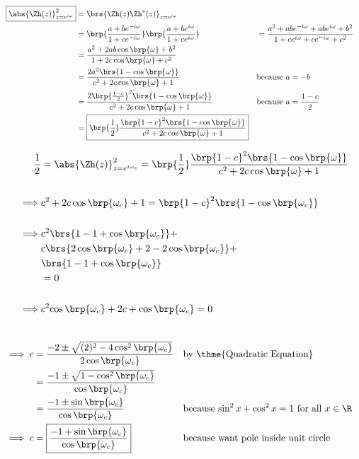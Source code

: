 %
\begin{align*}
  \boxed{\abs{\Zh(z)}^2_{z=e^{i\omega}}}
    &= \brs{\Zh(z)\Zh^\ast(z)}_{z=e^{i\omega}}
  \\&= \brp{\frac{a + be^{-i\omega}}{1 + ce^{-i\omega}}}
       \brp{\frac{a + be^{i\omega}}{1 + ce^{i\omega}}}
   &&= \frac{a^2 + abe^{-i\omega} + abe^{i\omega} + b^2}
            {1   +  ce^{i\omega} +  ce^{-i\omega} + c^2}
  \\&= \frac{a^2 + 2ab\cos\brp{\omega} + b^2}
            {1   + 2 c\cos\brp{\omega} + c^2}
  \\&= \frac{2a^2\brs{1 -  \cos\brp{\omega}}}
            {c^2 + 2 c\cos\brp{\omega} + 1}
    && \text{because $a=-b$}
  \\&= \frac{2\brp{\frac{1-c}{2}}^2\brs{1 -  \cos\brp{\omega}}}
            {c^2 + 2 c\cos\brp{\omega} + 1}
    && \text{because $a=\frac{1-c}{2}$}
  \\&= \boxed{\brp{\frac{1}{2}}
              \frac{\brp{1-c}^2\brs{1 -  \cos\brp{\omega}}}
                   {c^2 + 2 c\cos\brp{\omega} + 1}
             }
\end{align*}

{\begin{align*}
  \frac{1}{2}
    &= \abs{\Zh(z)}^2_{z=e^{i\omega_c}}
     = \brp{\frac{1}{2}}
       \frac{\brp{1-c}^2\brs{1 -  \cos\brp{\omega}}}
            {c^2 + 2 c\cos\brp{\omega} + 1}
  \\\\\implies &c^2 + 2 c\cos\brp{\omega_c} + 1 
             = \brp{1-c}^2\brs{1 -  \cos\brp{\omega_c}}
  \\\\\implies & c^2\brs{1-1+\cos\brp{\omega_c}} + 
             \\& c  \brs{2\cos\brp{\omega_c}+2-2\cos\brp{\omega_c}} +
             \\&    \brs{1-1+\cos\brp{\omega_c}}
             \\&= 0
  \\\\\implies & c^2{\cos\brp{\omega_c}} 
             + 2c 
             +    \cos\brp{\omega_c}
             = 0
\end{align*}}



{\begin{align*}
  \\\implies c &= \frac{-2 \pm \sqrt{(2)^2 -4\cos^2\brp{\omega_c}}}
                       {2\cos\brp{\omega_c}}
               && \text{by \thme{Quadratic Equation}}
             \\&= \frac{-1 \pm \sqrt{1 -\cos^2\brp{\omega_c}}}
                       {\cos\brp{\omega_c}}
             \\&= \frac{-1 \pm \sin\brp{\omega_c}}
                       {\cos\brp{\omega_c}}
               && \text{because $\sin^2x + \cos^2x = 1$ for all $x\in\R$}
  \\\implies c &=
      \boxed{\frac{-1 + \sin\brp{\omega_c}}
                    {\cos\brp{\omega_c}}}
               && \text{because want pole inside unit circle}
\end{align*}}


